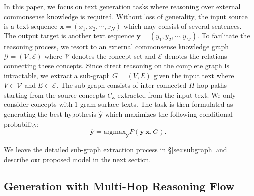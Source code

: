 \documentclass[11pt,a4paper]{article}
\begin{document}
In this paper, we focus on text generation tasks where reasoning over external commonsense knowledge is required. Without loss of generality, the input source is a text sequence $\bm{x}=(x_1,x_2,\cdots, x_N)$ which may consist of several sentences. The output target is another text sequence $\bm{y}=(y_1,y_2,\cdots,y_M)$. %
To facilitate the reasoning process, we resort to an external commonsense knowledge graph $\mathcal{G}=(\mathcal{V}, \mathcal{E})$ where $\mathcal{V}$ denotes the concept set and $\mathcal{E}$ denotes the relations connecting these concepts. Since direct reasoning on the complete graph is intractable, we extract a sub-graph $G=(V,E)$ given the input text where $V\subset\mathcal{V}$ and $E\subset\mathcal{E}$. %
The sub-graph consists of inter-connected $H$-hop paths starting from the source concepts $C_{\bm{x}}$ extracted from the input text. We only consider concepts with $1$-gram surface texts. The task is then formulated as generating the best hypothesis $\hat{\bm{y}}$ which maximizes the following conditional probability:
\begin{equation}
    \hat{\bm{y}}=\text{argmax}_{\bm{y}}P(\bm{y}|\bm{x}, G).
\end{equation}

We leave the detailed sub-graph extraction process in \S{\ref{sec:subgraph}} and describe our proposed model in the next section.

\subsection{Generation with Multi-Hop Reasoning Flow}

\end{document}
